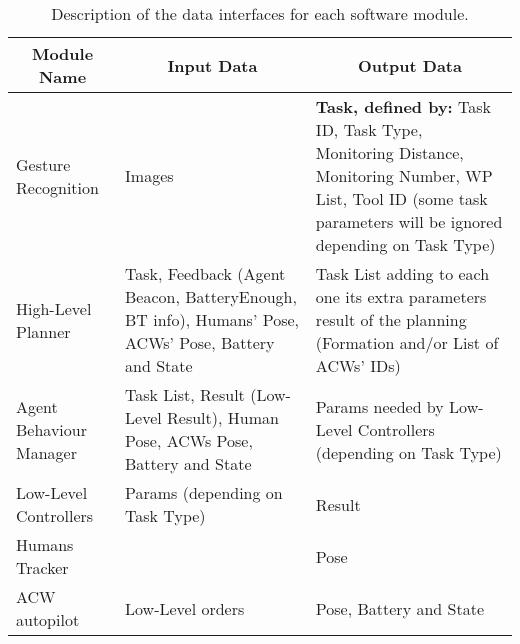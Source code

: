 \begin{table}[ht]
    \centering
    \caption{Description of the data interfaces for each software module.}
    \label{tab:interfaces}
    \small
    \begin{tabular}{|p{}|p{}|p{}|}
      \hline
      \multicolumn{1}{|c}{\textbf{Module Name}} & \multicolumn{1}{|c|}{\textbf{Input Data}} & \multicolumn{1}{c|}{\textbf{Output Data}}\\ \hline \hline
      Gesture Recognition & Images & \textbf{Task, defined by:} Task ID, Task Type, Monitoring Distance, Monitoring Number, WP List, Tool ID (some task parameters will be ignored depending on Task Type) \\ \hline
      
      High-Level Planner & Task, Feedback (Agent Beacon, BatteryEnough, \gls{BT} info), Humans' Pose, \glspl{ACW}' Pose, Battery and State & Task List adding to each one its extra parameters result of the planning (Formation and/or List of \glspl{ACW}' IDs) \\\hline
      
      Agent Behaviour Manager & Task List, Result (Low-Level Result), Human Pose, \glspl{ACW} Pose, Battery and State & Params needed by Low-Level Controllers (depending on Task Type) \\ \hline
      
      Low-Level Controllers & Params (depending on Task Type) & Result \\ \hline
      
      Humans Tracker &  & Pose \\ \hline
      
      \gls{ACW} autopilot & Low-Level orders & Pose, Battery and State \\ \hline
      
    \end{tabular}
\end{table}
  
